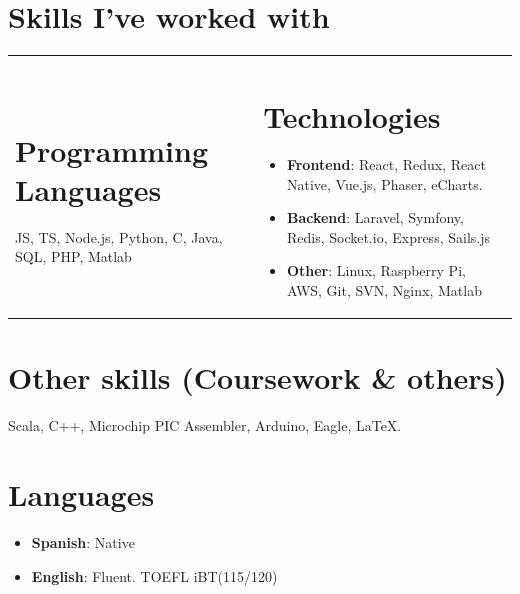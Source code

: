 \documentclass[letterpaper,11pt]{article}
\newcommand{\resumeItem}[2]{
  \item\small{
    \textbf{#1}{: #2 \vspace{-2pt}}
  }
}
\newcommand{\resumeSubItem}[2]{\resumeItem{#1}{#2}\vspace{-4pt}}
\newcommand{\resumeItemListStart}{\begin{itemize}}
\newcommand{\resumeItemListEnd}{\end{itemize}\vspace{-5pt}}
\begin{document}
  \section{Skills I've worked with}
  \vspace{-30pt}
\begin{tabular}{p{9cm}p{9cm}}
  \section{Programming Languages}
  JS, TS, Node.js, Python, C, Java, SQL, PHP, Matlab
  \hfill &

  \section{Technologies}
    \resumeItemListStart
    \resumeSubItem{Frontend}{React, Redux, React Native, Vue.js, Phaser, eCharts.}
    \resumeSubItem{Backend}{Laravel, Symfony, Redis, Socket.io, Express, Sails.js}
    \resumeSubItem{Other}{Linux, Raspberry Pi, AWS, Git, SVN, Nginx, Matlab}
    \resumeItemListEnd
  \end{tabular}

  \section{Other skills (Coursework \& others)}
    Scala, C++, Microchip PIC Assembler, Arduino, Eagle, \LaTeX.

  \section{Languages}
  \resumeItemListStart
  \resumeSubItem{Spanish}{Native}
  \resumeSubItem{English}{Fluent. TOEFL iBT(115/120)}
  \resumeItemListEnd
\end{document}
